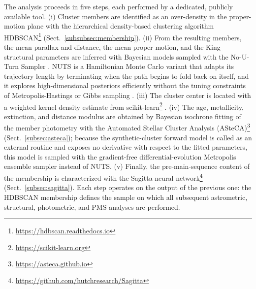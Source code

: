 \documentclass{aa}
\begin{document}
The analysis proceeds in five steps, each performed by a dedicated, publicly available tool\@. (i) Cluster members are identified as an over-density in the proper-motion plane with the hierarchical density-based clustering algorithm HDBSCAN\footnote{\url{https://hdbscan.readthedocs.io}} \citep{10.1007/978-3-642-37456-2_14,McInnes2017} (Sect.~\ref{subsubsec:membership})\@. (ii) From the resulting members, the mean parallax and distance, the mean proper motion, and the King structural parameters are inferred with Bayesian models sampled with the No-U-Turn Sampler \citep[NUTS;][]{2014JMLR...15.1593H}. NUTS is a Hamiltonian Monte Carlo variant that adapts its trajectory length by terminating when the path begins to fold back on itself, and it explores high-dimensional posteriors efficiently without the tuning constraints of Metropolis-Hastings or Gibbs sampling \citep{pymc2023}\@. (iii) The cluster center is located with a weighted kernel density estimate from scikit-learn\footnote{\url{https://scikit-learn.org}} \citep{scikit-learn}\@. (iv) The age, metallicity, extinction, and distance modulus are obtained by Bayesian isochrone fitting of the member photometry with the Automated Stellar Cluster Analysis (ASteCA)\footnote{\url{https://asteca.github.io}} \citep{2015A&A...576A...6P} (Sect.~\ref{subsec:asteca}); because the synthetic-cluster forward model is called as an external routine and exposes no derivative with respect to the fitted parameters, this model is sampled with the gradient-free differential-evolution Metropolis ensemble sampler \citep[DEMetropolis;][]{2006S&C....16..239T} instead of NUTS\@. (v) Finally, the pre-main-sequence content of the membership is characterized with the Sagitta neural network\footnote{\url{https://github.com/hutchresearch/Sagitta}} \citep{2021AJ....162..282M} (Sect.~\ref{subsec:sagitta}). Each step operates on the output of the previous one: the HDBSCAN membership defines the sample on which all subsequent astrometric, structural, photometric, and PMS analyses are performed.
\end{document}
